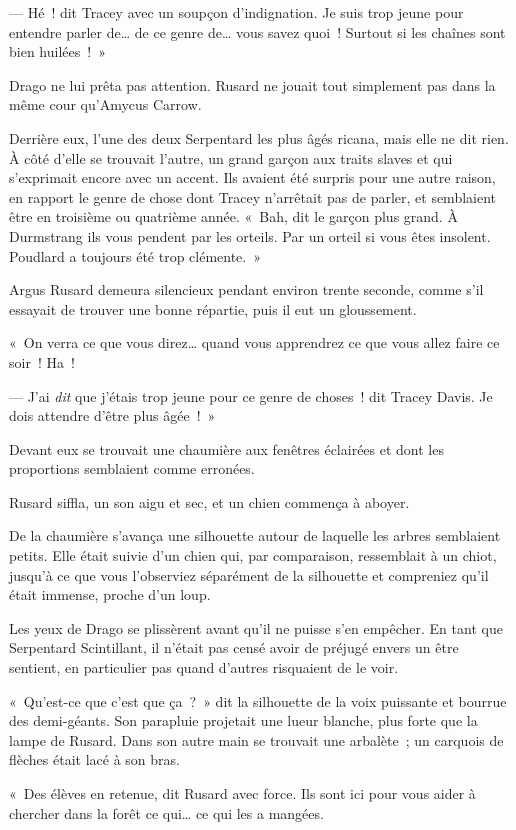 --- Hé~! dit Tracey avec un soupçon d'indignation. Je suis trop jeune pour entendre parler de… de ce genre de… vous savez quoi~! Surtout si les chaînes sont bien huilées~!~»

Drago ne lui prêta pas attention. Rusard ne jouait tout simplement pas dans la même cour qu'Amycus Carrow.

Derrière eux, l'une des deux Serpentard les plus âgés ricana, mais elle ne dit rien. À côté d'elle se trouvait l'autre, un grand garçon aux traits slaves et qui s'exprimait encore avec un accent. Ils avaient été surpris pour une autre raison, en rapport le genre de chose dont Tracey n'arrêtait pas de parler, et semblaient être en troisième ou quatrième année. «~Bah, dit le garçon plus grand. À Durmstrang ils vous pendent par les orteils. Par un orteil si vous êtes insolent. Poudlard a toujours été trop clémente.~»

Argus Rusard demeura silencieux pendant environ trente seconde, comme s'il essayait de trouver une bonne répartie, puis il eut un gloussement.

«~On verra ce que vous direz… quand vous apprendrez ce que vous allez faire ce soir~! Ha~!

--- J'ai \emph{dit} que j'étais trop jeune pour ce genre de choses~! dit Tracey Davis. Je dois attendre d'être plus âgée~!~»

Devant eux se trouvait une chaumière aux fenêtres éclairées et dont les proportions semblaient comme erronées.

Rusard siffla, un son aigu et sec, et un chien commença à aboyer.

De la chaumière s'avança une silhouette autour de laquelle les arbres semblaient petits. Elle était suivie d'un chien qui, par comparaison, ressemblait à un chiot, jusqu'à ce que vous l'observiez séparément de la silhouette et compreniez qu'il était immense, proche d'un loup.

Les yeux de Drago se plissèrent avant qu'il ne puisse s'en empêcher. En tant que Serpentard Scintillant, il n'était pas censé avoir de préjugé envers un être sentient, en particulier pas quand d'autres risquaient de le voir.

«~Qu'est-ce que c'est que ça~?~» dit la silhouette de la voix puissante et bourrue des demi-géants. Son parapluie projetait une lueur blanche, plus forte que la lampe de Rusard. Dans son autre main se trouvait une arbalète~; un carquois de flèches était lacé à son bras.

«~Des élèves en retenue, dit Rusard avec force. Ils sont ici pour vous aider à chercher dans la forêt ce qui… ce qui les a mangées.


